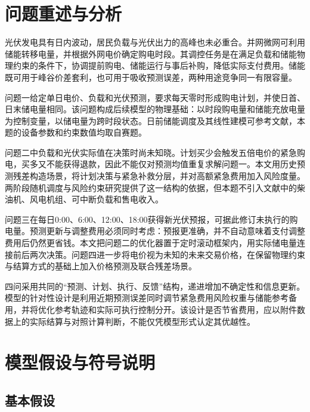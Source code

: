 \section{问题重述与分析}

光伏发电具有日内波动，居民负载与光伏出力的高峰也未必重合。并网微网可利用储能转移电量，并根据外网电价确定购电时段。其调控任务是在满足负载和储能物理约束的条件下，协调提前购电、储能运行与事后补购，降低实际支付费用。储能既可用于峰谷价差套利，也可用于吸收预测误差，两种用途竞争同一有限容量。

问题一给定单日电价、负载和光伏预测，要求每天零时形成购电计划，并使日首、日末储电量相同。该问题构成后续模型的物理基础：以时段购电量和储能充放电量为控制变量，以储电量为跨时段状态。日前储能调度及其线性建模可参考文献\cite{kong2016,silva2020}，本题的设备参数和约束数值均取自赛题。

问题二中负载和光伏实际值在决策时尚未知晓。计划买少会触发五倍电价的紧急购电，买多又不能获得退款，因此不能仅对预测均值重复求解问题一。本文用历史预测残差构造场景，将计划决策与紧急补救分层，并对高额紧急费用加入风险度量。两阶段随机调度与风险约束研究\cite{abunima2022,marino2018,grover2018}提供了这一结构的依据，但本题不引入文献中的柴油机、风电机组、可中断负载和售电收入。

问题三在每日0:00、6:00、12:00、18:00获得新光伏预报，可据此修订未执行的购电量。预测更新与调整费用必须同时考虑：预报更准确，并不自动意味着支付调整费用后仍然更省钱。本文把问题二的优化器置于定时滚动框架内，用实际储电量连接前后两次决策\cite{palma2013,silvente2015,li2016,jani2022}。问题四进一步将电价视为未知的未来交易价格，在保留物理约束与结算方式的基础上加入价格预测及联合残差场景\cite{li2016,li2020}。

四问采用共同的“预测、计划、执行、反馈”结构，递进增加不确定性和信息更新。模型的针对性设计是利用近期预测误差同时调节紧急费用风险权重与储能参考备用，并将优化参考轨迹和实际可执行控制分开。该设计是否节省费用，应以附件数据上的实际结算与对照计算判断，不能仅凭模型形式认定其优越性。

\section{模型假设与符号说明}

\subsection{基本假设}

